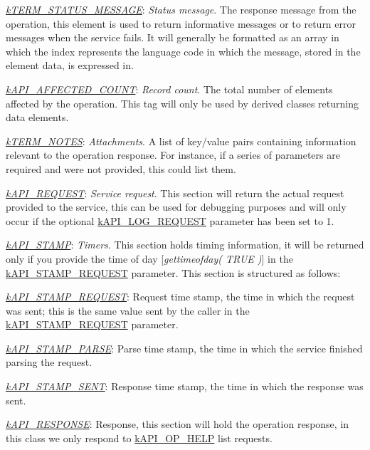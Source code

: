 {\begin{DoxyItemize}
\begin{DoxyItemize}
\item {\itshape \hyperlink{}{k\-T\-E\-R\-M\-\_\-\-S\-T\-A\-T\-U\-S\-\_\-\-M\-E\-S\-S\-A\-G\-E}}\-: {\itshape Status message}. The response message from the operation, this element is used to return informative messages or to return error messages when the service fails. It will generally be formatted as an array in which the index represents the language code in which the message, stored in the element data, is expressed in. 
\item {\itshape \hyperlink{}{k\-A\-P\-I\-\_\-\-A\-F\-F\-E\-C\-T\-E\-D\-\_\-\-C\-O\-U\-N\-T}}\-: {\itshape Record count}. The total number of elements affected by the operation. This tag will only be used by derived classes returning data elements. 
\item {\itshape \hyperlink{}{k\-T\-E\-R\-M\-\_\-\-N\-O\-T\-E\-S}}\-: {\itshape Attachments}. A list of key/value pairs containing information relevant to the operation response. For instance, if a series of parameters are required and were not provided, this could list them. 
\end{DoxyItemize}
\item {\itshape \hyperlink{}{k\-A\-P\-I\-\_\-\-R\-E\-Q\-U\-E\-S\-T}}\-: {\itshape Service request}. This section will return the actual request provided to the service, this can be used for debugging purposes and will only occur if the optional \hyperlink{}{k\-A\-P\-I\-\_\-\-L\-O\-G\-\_\-\-R\-E\-Q\-U\-E\-S\-T} parameter has been set to 1. 
\item {\itshape \hyperlink{}{k\-A\-P\-I\-\_\-\-S\-T\-A\-M\-P}}\-: {\itshape Timers}. This section holds timing information, it will be returned only if you provide the time of day \mbox{[}{\itshape gettimeofday( T\-R\-U\-E )}\mbox{]} in the \hyperlink{}{k\-A\-P\-I\-\_\-\-S\-T\-A\-M\-P\-\_\-\-R\-E\-Q\-U\-E\-S\-T} parameter. This section is structured as follows\-: 
\begin{DoxyItemize}
\item {\itshape \hyperlink{}{k\-A\-P\-I\-\_\-\-S\-T\-A\-M\-P\-\_\-\-R\-E\-Q\-U\-E\-S\-T}}\-: Request time stamp, the time in which the request was sent; this is the same value sent by the caller in the \hyperlink{}{k\-A\-P\-I\-\_\-\-S\-T\-A\-M\-P\-\_\-\-R\-E\-Q\-U\-E\-S\-T} parameter. 
\item {\itshape \hyperlink{}{k\-A\-P\-I\-\_\-\-S\-T\-A\-M\-P\-\_\-\-P\-A\-R\-S\-E}}\-: Parse time stamp, the time in which the service finished parsing the request. 
\item {\itshape \hyperlink{}{k\-A\-P\-I\-\_\-\-S\-T\-A\-M\-P\-\_\-\-S\-E\-N\-T}}\-: Response time stamp, the time in which the response was sent. 
\end{DoxyItemize}
\item {\itshape \hyperlink{}{k\-A\-P\-I\-\_\-\-R\-E\-S\-P\-O\-N\-S\-E}}\-: Response, this section will hold the operation response, in this class we only respond to \hyperlink{}{k\-A\-P\-I\-\_\-\-O\-P\-\_\-\-H\-E\-L\-P} list requests. 
\end{DoxyItemize}}

